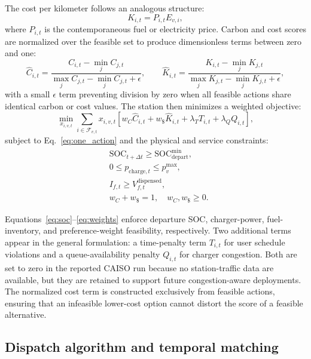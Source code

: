 \documentclass[cleantechnol,article,submit,pdftex,moreauthors]{Definitions/mdpi}
\begin{document}
The cost per kilometer follows an analogous structure:
\begin{equation}
	K_{i,t}=P_{i,t}E_{v,i},
	\label{eq:cost}
\end{equation}
where $P_{i,t}$ is the contemporaneous fuel or electricity price. Carbon and cost scores are normalized over the feasible set to produce dimensionless terms between zero and one:
\begin{equation}
	\widehat{C}_{i,t}=\frac{C_{i,t}-\min_j C_{j,t}}{\max_j C_{j,t}-\min_j C_{j,t}+\epsilon}, \qquad
	\widehat{K}_{i,t}=\frac{K_{i,t}-\min_j K_{j,t}}{\max_j K_{j,t}-\min_j K_{j,t}+\epsilon},
	\label{eq:normalization}
\end{equation}
with a small $\epsilon$ term preventing division by zero when all feasible actions share identical carbon or cost values. The station then minimizes a weighted objective:
\begin{equation}
	\min_{x_{i,v,t}} \sum_{i\in\mathcal{F}_{v,t}}x_{i,v,t}
	\left[w_C\widehat{C}_{i,t}+w_\$\widehat{K}_{i,t}+\lambda_T T_{i,t}+\lambda_Q Q_{i,t}\right],
	\label{eq:objective}
\end{equation}
subject to Eq.~\eqref{eq:one_action} and the physical and service constraints:
\begin{align}
	&\mathrm{SOC}_{t+\Delta t}\geq \mathrm{SOC}^{\min}_{\mathrm{depart}},\label{eq:soc}\\
	&0\leq p_{\mathrm{charge},t}\leq p^{\max}_v,\label{eq:power}\\
	&I_{f,t}\geq V_{f,t}^{\mathrm{dispensed}},\label{eq:inventory}\\
	&w_C+w_\$=1, \quad w_C,w_\$\geq 0.\label{eq:weights}
\end{align}

Equations~\eqref{eq:soc}--\eqref{eq:weights} enforce departure SOC, charger-power, fuel-inventory, and preference-weight feasibility, respectively. Two additional terms appear in the general formulation: a time-penalty term $T_{i,t}$ for user schedule violations and a queue-availability penalty $Q_{i,t}$ for charger congestion. Both are set to zero in the reported CAISO run because no station-traffic data are available, but they are retained to support future congestion-aware deployments. The normalized cost term is constructed exclusively from feasible actions, ensuring that an infeasible lower-cost option cannot distort the score of a feasible alternative.


\subsection{Dispatch algorithm and temporal matching}
\label{subsec:dispatch_algorithm}
\end{document}
